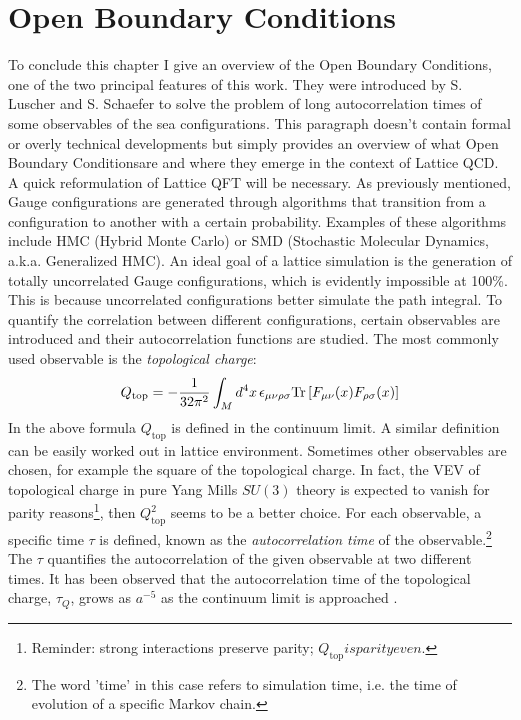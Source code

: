 \documentclass[english, LaM, oneside, noexaminfo]{sapthesis}
\newcommand{\obc}{Open Boundary Conditions}
\newcommand{\tr}{\text{Tr}}
\begin{document}
\section{\obc}\label{sec:obc}
\noindent
To conclude this chapter I give an overview of the \obc, one of the two principal features of this work.
They were introduced by S. Luscher and S. Schaefer \cite{OBC_top} to solve the problem of long autocorrelation times of some observables of the sea configurations.
This paragraph doesn't contain formal or overly technical developments but simply provides an overview of what \obc\space are and where they emerge in the context of Lattice QCD.
A quick reformulation of Lattice QFT will be necessary.
\newline
As previously mentioned, Gauge configurations are generated through algorithms that transition from a configuration to another with a certain probability.
Examples of these algorithms include HMC (Hybrid Monte Carlo) or SMD (Stochastic Molecular Dynamics, a.k.a. Generalized HMC).
An ideal goal of a lattice simulation is the generation of totally uncorrelated Gauge configurations, which is evidently impossible at 100\%.
This is because uncorrelated configurations better simulate the path integral.
To quantify the correlation between different configurations, certain observables are introduced and their autocorrelation functions are studied.
The most commonly used observable is the {\it topological charge}:
\begin{equation*}
    Q_\text{top} = -\frac{1}{32\pi^2}\int_M d^4x \hspace*{.5mm} \epsilon_{\mu\nu\rho\sigma} \tr \left[F_{\mu\nu}(x) F_{\rho\sigma}(x)\right]
\end{equation*}
In the above formula $Q_\text{top}$ is defined in the continuum limit.
A similar definition can be easily worked out in lattice environment.
Sometimes other observables are chosen, for example the square of the topological charge.
In fact, the VEV of topological charge in pure Yang Mills $SU(3)$ theory is expected to vanish for parity reasons\footnote{Reminder: strong interactions preserve parity; $Q_\text{top} is parity even.$}, then $Q_\text{top}^2$ seems to be a better choice.
For each observable, a specific time $\tau$ is defined, known as the {\it autocorrelation time} of the observable.\footnote{The word 'time' in this case refers to simulation time, i.e. the time of evolution of a specific Markov chain.}
The $\tau$ quantifies the autocorrelation of the given observable at two different times.
It has been observed that the autocorrelation time of the topological charge, $\tau_Q$, grows as $a^{-5}$ as the continuum limit is approached \cite{Topology-WilsonFlow-HMC}.
\end{document}
